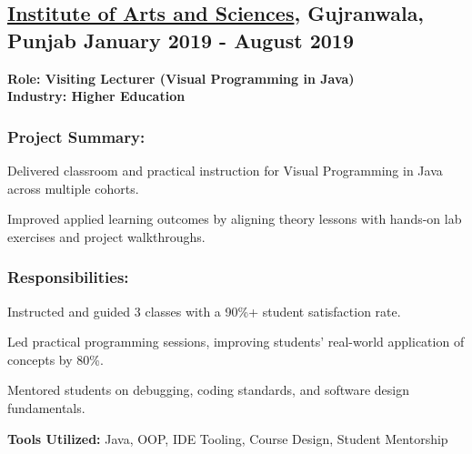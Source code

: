 \subsection{\textbf{\href{https://iasgc.edu.pk/}{Institute of Arts and Sciences}, Gujranwala, Punjab} \hfill January 2019 - August 2019}
\noindent\textbf{Role: Visiting Lecturer (Visual Programming in Java)}\\
\noindent\textbf{Industry: Higher Education}

\subsubsection*{\textbf{Project Summary:}}
\begin{zitemize}
\item Delivered classroom and practical instruction for Visual Programming in Java across multiple cohorts.
\item Improved applied learning outcomes by aligning theory lessons with hands-on lab exercises and project walkthroughs.
\end{zitemize}

\subsubsection*{\textbf{Responsibilities:}}
\begin{zitemize}
\item Instructed and guided 3 classes with a 90\%+ student satisfaction rate.
\item Led practical programming sessions, improving students' real-world application of concepts by 80\%.
\item Mentored students on debugging, coding standards, and software design fundamentals.
\end{zitemize}

\noindent\textbf{Tools Utilized:} Java, OOP, IDE Tooling, Course Design, Student Mentorship

